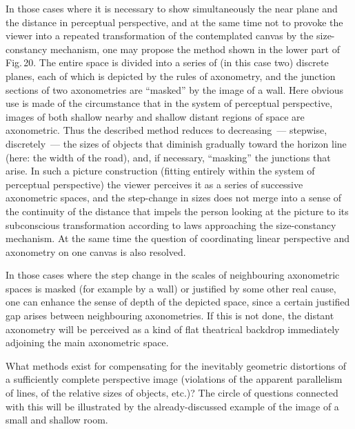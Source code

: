 In those cases where it is necessary to show simultaneously the near plane and the
distance in perceptual perspective, and at the same time not to provoke the viewer into
a repeated transformation of the contemplated canvas by the size-constancy mechanism,
one may propose the method shown in the lower part of Fig.\,20.  The entire space is
divided into a series of (in this case two) discrete planes, each of which is depicted by
the rules of axonometry, and the junction sections of two axonometries are ``masked'' by
the image of a wall.  Here obvious use is made of the circumstance that in the system
of perceptual perspective, images of both shallow nearby and shallow distant regions of
space are axonometric.  Thus the described method reduces to decreasing~---
stepwise, discretely~--- the sizes of objects that diminish gradually toward the horizon
line (here: the width of the road), and, if necessary, ``masking'' the junctions that arise.
In such a picture construction (fitting entirely within the system of perceptual
perspective) the viewer perceives it as a series of successive axonometric spaces, and
the step-change in sizes does not merge into a sense of the continuity of the distance
that impels the person looking at the picture to its subconscious transformation according
to laws approaching the size-constancy mechanism.  At the same time the question of
coordinating linear perspective and axonometry on one canvas is also resolved.

In those cases where the step change in the scales of neighbouring axonometric spaces
is masked (for example by a wall) or justified by some other real cause, one can enhance
the sense of depth of the depicted space, since a certain justified gap arises between
neighbouring axonometries.  If this is not done, the distant axonometry will be perceived
as a kind of flat theatrical backdrop immediately adjoining the main axonometric space.


What methods exist for compensating for the inevitably geometric distortions of a
sufficiently complete perspective image (violations of the apparent parallelism of lines,
of the relative sizes of objects, etc.)?  The circle of questions connected with this will
be illustrated by the already-discussed example of the image of a small and shallow
room.

